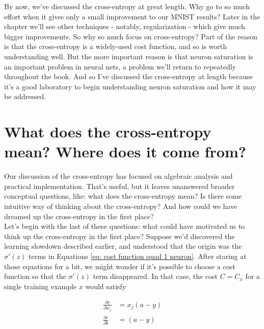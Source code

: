 \documentclass[a4paper,11pt,twoside]{report}
\begin{document}
By now, we've discussed the cross-entropy at great length. Why go to so much effort when it gives only a small improvement to our MNIST results? Later in the chapter we'll see other techniques - notably, regularization - which give much bigger improvements. So why so much focus on cross-entropy? Part of the reason is that the cross-entropy is a widely-used cost function, and so is worth understanding well. But the more important reason is that neuron saturation is an important problem in neural nets, a problem we'll return to repeatedly throughout the book. And so I've discussed the cross-entropy at length because it's a good laboratory to begin understanding neuron saturation and how it may be addressed.\\

\section{What does the cross-entropy mean? Where does it come from?}
\label{sec: What does the cross-entropy mean? Where does it come from?}

Our discussion of the cross-entropy has focused on algebraic analysis and practical implementation. That's useful, but it leaves unanswered broader conceptual questions, like: what does the cross-entropy mean? Is there some intuitive way of thinking about the cross-entropy? And how could we have dreamed up the cross-entropy in the first place?\\

Let's begin with the last of these questions: what could have motivated us to think up the cross-entropy in the first place? Suppose we'd discovered the learning slowdown described earlier, and understood that the origin was the $\sigma'(z)$ terms in Equations \ref{eq: cost function quad 1 neuron}. After staring at those equations for a bit, we might wonder if it's possible to choose a cost function so that the $\sigma'(z)$ term disappeared. In that case, the cost $C=C_x$ for a single training example $x$ would satisfy

\begin{equation}
\begin{aligned}
\frac{\partial c}{\partial w_j}&=x_j(a-y)\\
\frac{\partial c}{\partial b}&=(a-y)
\end{aligned}
\label{eq: form of partial derivative cost with resp w and b that we search for}
\end{equation}
\end{document}
